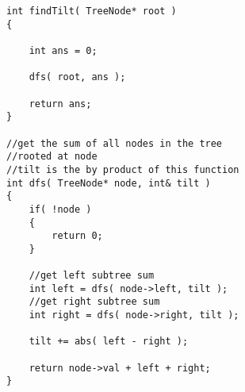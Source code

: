 \setcounter{lstlisting}{0}
\begin{lstlisting}[style=customc, caption={Recursion}]
int findTilt( TreeNode* root )
{

    int ans = 0;

    dfs( root, ans );

    return ans;
}

//get the sum of all nodes in the tree
//rooted at node
//tilt is the by product of this function
int dfs( TreeNode* node, int& tilt )
{
    if( !node )
    {
        return 0;
    }

    //get left subtree sum
    int left = dfs( node->left, tilt );
    //get right subtree sum
    int right = dfs( node->right, tilt );

    tilt += abs( left - right );

    return node->val + left + right;
}
\end{lstlisting}